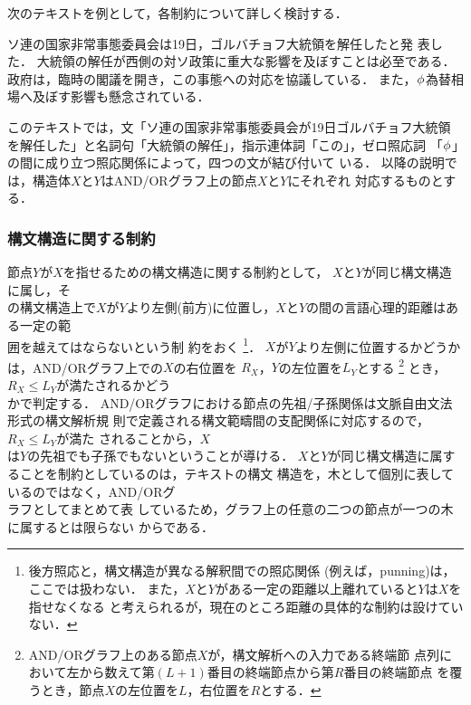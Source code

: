 次のテキストを例として，各制約について詳しく検討する．
\begin{TEXT}
\text ソ連の国家非常事態委員会は19日，ゴルバチョフ大統領を解任したと発
表した．
大統領の解任が西側の対ソ政策に重大な影響を及ぼすことは必至である．
政府は，臨時の閣議を開き，この事態への対応を協議している．
また，$\phi_{}$為替相場へ及ぼす影響も懸念されている．
\label{TEXT:gorb_wellform}
\end{TEXT}
このテキストでは，文「ソ連の国家非常事態委員会が19日ゴルバチョフ大統領
を解任した」と名詞句「大統領の解任」，指示連体詞「この」，ゼロ照応詞
「$\phi_{}$」の間に成り立つ照応関係によって，四つの文が結び付いて
いる．
以降の説明では，構造体$X$と$Y$はAND/ORグラフ上の節点$X$と$Y$にそれぞれ
対応するものとする．

\subsubsection{構文構造に関する制約}
\label{sec:twg:corref:syn}

節点$Y$\hspace*{-0.1mm}が\hspace*{-0.1mm}$X$\hspace*{-0.1mm}を指せるための構文構造に関する制約として， \hspace*{-0.5mm}$X$\hspace*{-0.1mm}と\hspace*{-0.1mm}$Y$\hspace*{-0.1mm}が同じ構文構造に属し，そ\\の構文構造上で$X$が$Y$\hspace*{-0.1mm}より左側(前方)に位置し，\hspace*{-0.5mm}$X$と$Y$\hspace*{-0.1mm}の間の言語心理的距離はある一定の範\\囲を越えてはならないという制
約をおく
\footnote{後方照応\cite{Hirst81}と，構文構造が異なる解釈間での照応関係
(例えば，punning)は，ここでは扱わない．
また，$X$と$Y$がある一定の距離以上離れていると$Y$は$X$を指せなくなる
と考えられるが，現在のところ距離の具体的な制約は設けていない．}．
$X$が$Y$より左側に位置するかどうかは，AND/ORグラフ上での$X$の右位置を
$R_X$，\hspace*{-0.3mm}$Y$\hspace*{-0.1mm}の左位置を$L_Y$\hspace*{-0.1mm}とする
\footnote{AND/ORグラフ上のある節点$X$が，構文解析への入力である終端節
点列において左から数えて第$(L+1)$番目の終端節点から第$R$番目の終端節点
を覆うとき，節点$X$の左位置を$L$，右位置を$R$とする．}
とき，\hspace*{-0.3mm}$R_X \le L_Y$が満たされるかどう\\かで判定する．
AND/ORグラフにおける節点の先祖/子孫関係は文脈自由文法形式の構文解析規
則で定義される構文範疇間の支配関係に対応するので，$R_X \le L_Y$が満た
されることから，$X$\\は$Y$の先祖でも子孫でもないということが導ける．
$X$と$Y$が同じ構文構造に属することを制約としているのは，テキストの構文
構造を，木として個別に表しているのではなく，AND/ORグ\\ラフとしてまとめて表
しているため，グラフ上の任意の二つの節点が一つの木に属するとは限らない
からである．


